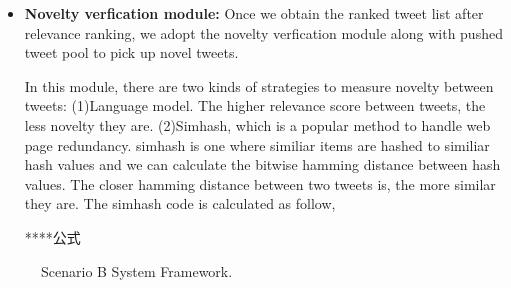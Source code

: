 \begin{itemize}
\item \textbf{Novelty verfication module:} Once we obtain the ranked tweet list after relevance ranking, we adopt the novelty verfication module along with pushed tweet pool to pick up novel tweets.


In this module, there are two kinds of strategies to measure novelty between tweets: (1)Language model. The higher relevance score between tweets, the less novelty they are. (2)Simhash, which is a popular method to handle web page redundancy. simhash is one where similiar items are hashed to similiar hash values and we can calculate the bitwise hamming distance between hash values. The closer hamming distance between two tweets is, the more similar they are. The simhash code is calculated as follow,

****公式
\end{itemize}

\begin{figure}[htbp]
\centering
{
}
\caption{Scenario B System Framework.}
\label{fig:Bsys}
\end{figure}





